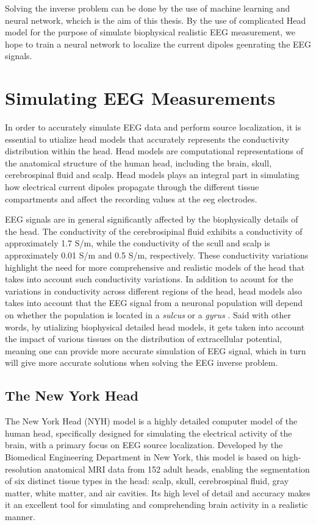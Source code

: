 \documentclass[a4paper, UKenglish, 11pt]{uiomaster}
\begin{document}
Solving the inverse problem can be done by the use of machine learning and neural network, whcich is the aim of this thesis. By the use of complicated Head model for the purpose of simulate biophysical realistic EEG measurement, we hope to train a neural network to localize the current dipoles geenrating the EEG signals.


\section{Simulating EEG Measurements}

In order to accurately simulate EEG data and perform source localization, it is essential to utialize head models that accurately represents the conductivity distribution within the head. Head models are computational representations of the anatomical structure of the human head, including the brain, skull, cerebrospinal fluid and scalp. Head models plays an integral part in simulating how electrical current dipoles propagate through the different tissue compartments and affect the recording values at the eeg electrodes.

EEG signals are in general significantly affected by the biophysically details of the head. The conductivity of the cerebrosipinal fluid exhibits a conductivity of approximately 1.7 S/m, while the conductivity of the scull and scalp is approximately 0.01 S/m and 0.5 S/m, respectively. These conductivity variations highlight the need for more comprehensive and realistic models of the head that takes into account such conductivity variations. In addition to acount for the variations in conductivity across different regions of the head, head models also takes into account that the EEG signal from a neuronal population will depend on whether the population is located in a \emph{sulcus} or a \emph{gyrus} \cite{naess2021biophysically}. Said with other words, by utializing biophysical detailed head models, it gets taken into account the impact of various tissues on the distribution of extracellular potential, meaning one can provide more accurate simulation of EEG signal, which in turn will give more accurate solutions when solving the EEG inverse problem.

\subsection{The New York Head}
The New York Head (NYH) model is a highly detailed computer model of the human head, specifically designed for simulating the electrical activity of the brain, with a primary focus on EEG source localization. Developed by the Biomedical Engineering Department in New York, this model is based on high-resolution anatomical MRI data from 152 adult heads, enabling the segmentation of six distinct tissue types in the head: scalp, skull, cerebrospinal fluid, gray matter, white matter, and air cavities. Its high level of detail and accuracy makes it an excellent tool for simulating and comprehending brain activity in a realistic manner.
\end{document}
